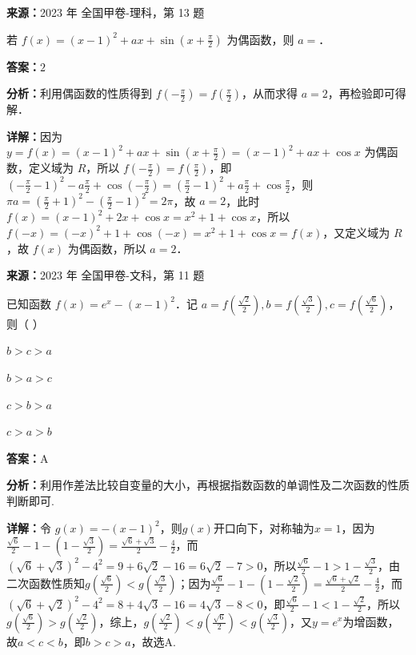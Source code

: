 \begin{question}[points=5]
\textbf{来源：}2023 年 全国甲卷-理科，第 13 题\par
若 $f(x) = (x-1)^2 + ax + \sin\left(x + \frac{\pi}{2}\right)$ 为偶函数，则 $a = $．
\fillin[{$2$}]
\begin{solution}
\textbf{答案：}$2$

\textbf{分析：}利用偶函数的性质得到 $f\left(-\frac{\pi}{2}\right) = f\left(\frac{\pi}{2}\right)$，从而求得 $a=2$，再检验即可得解．

\textbf{详解：}因为 $y = f(x) = (x-1)^2 + ax + \sin\left(x+\frac{\pi}{2}\right) = (x-1)^2 + ax + \cos x$ 为偶函数，定义域为 $R$，所以 $f\left(-\frac{\pi}{2}\right) = f\left(\frac{\pi}{2}\right)$，即 $\left(-\frac{\pi}{2}-1\right)^2 - a\frac{\pi}{2} + \cos\left(-\frac{\pi}{2}\right) = \left(\frac{\pi}{2}-1\right)^2 + a\frac{\pi}{2} + \cos\frac{\pi}{2}$，则 $\pi a = \left(\frac{\pi}{2}+1\right)^2 - \left(\frac{\pi}{2}-1\right)^2 = 2\pi$，故 $a=2$，此时 $f(x) = (x-1)^2 + 2x + \cos x = x^2 + 1 + \cos x$，所以 $f(-x) = (-x)^2 + 1 + \cos(-x) = x^2+1+\cos x = f(x)$，又定义域为 $R$，故 $f(x)$ 为偶函数，所以 $a=2$．
\end{solution}
\end{question}

\begin{question}[points=5]
\textbf{来源：}2023 年 全国甲卷-文科，第 11 题\par
已知函数 $f(x)=e^x-(x-1)^2$．记 $a=f\left(\frac{\sqrt{2}}{2}\right), b=f\left(\frac{\sqrt{3}}{2}\right), c=f\left(\frac{\sqrt{6}}{2}\right)$，则（    ）
\begin{choices}
  \item $b>c>a$
  \item $b>a>c$
  \item $c>b>a$
  \item $c>a>b$
\end{choices}
\begin{solution}
\textbf{答案：}A

\textbf{分析：}利用作差法比较自变量的大小，再根据指数函数的单调性及二次函数的性质判断即可.

\textbf{详解：}令 $g(x)=-(x-1)^2$，则$g(x)$开口向下，对称轴为$x=1$，因为$\frac{\sqrt{6}}{2}-1-(1-\frac{\sqrt{3}}{2})=\frac{\sqrt{6}+\sqrt{3}}{2}-\frac{4}{2}$，而$(\sqrt{6}+\sqrt{3})^2-4^2=9+6\sqrt{2}-16=6\sqrt{2}-7>0$，所以$\frac{\sqrt{6}}{2}-1>1-\frac{\sqrt{3}}{2}$，由二次函数性质知$g(\frac{\sqrt{6}}{2})<g(\frac{\sqrt{3}}{2})$；因为$\frac{\sqrt{6}}{2}-1-(1-\frac{\sqrt{2}}{2})=\frac{\sqrt{6}+\sqrt{2}}{2}-\frac{4}{2}$，而$(\sqrt{6}+\sqrt{2})^2-4^2=8+4\sqrt{3}-16=4\sqrt{3}-8<0$，即$\frac{\sqrt{6}}{2}-1<1-\frac{\sqrt{2}}{2}$，所以$g(\frac{\sqrt{6}}{2})>g(\frac{\sqrt{2}}{2})$，综上，$g(\frac{\sqrt{2}}{2})<g(\frac{\sqrt{6}}{2})<g(\frac{\sqrt{3}}{2})$，又$y=e^x$为增函数，故$a<c<b$，即$b>c>a$，故选A.
\end{solution}
\end{question}

